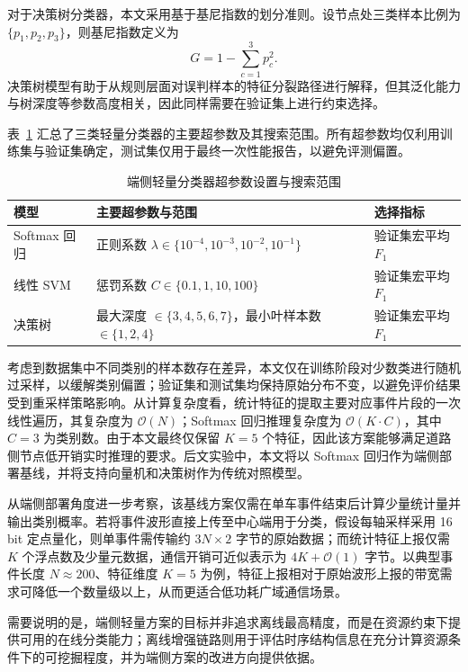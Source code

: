 \documentclass{xdupgthesis}
\begin{document}
对于决策树分类器，本文采用基于基尼指数的划分准则。设节点处三类样本比例为 $\{p_1,p_2,p_3\}$，则基尼指数定义为
\begin{equation}
    G=1-\sum_{c=1}^{3}p_c^2.
\end{equation}
决策树模型有助于从规则层面对误判样本的特征分裂路径进行解释，但其泛化能力与树深度等参数高度相关，因此同样需要在验证集上进行约束选择。

表~\ref{tab:ch3_edge_hyper} 汇总了三类轻量分类器的主要超参数及其搜索范围。所有超参数均仅利用训练集与验证集确定，测试集仅用于最终一次性能报告，以避免评测偏置。

\begin{table}[!htbp]
\centering
\small
\caption{端侧轻量分类器超参数设置与搜索范围}
\label{tab:ch3_edge_hyper}
\setlength{\tabcolsep}{6pt}
\renewcommand{\arraystretch}{1.15}
\begin{tabular}{p{3.1cm} p{7.2cm} p{2.8cm}}
\hline
模型 & 主要超参数与范围 & 选择指标 \\
\hline
Softmax 回归 & 正则系数 $\lambda\in\{10^{-4},10^{-3},10^{-2},10^{-1}\}$ & 验证集宏平均 $F_1$ \\
线性 SVM & 惩罚系数 $C\in\{0.1,1,10,100\}$ & 验证集宏平均 $F_1$ \\
决策树 & 最大深度 $\in\{3,4,5,6,7\}$，最小叶样本数 $\in\{1,2,4\}$ & 验证集宏平均 $F_1$ \\
\hline
\end{tabular}
\end{table}

考虑到数据集中不同类别的样本数存在差异，本文仅在训练阶段对少数类进行随机过采样，以缓解类别偏置；验证集和测试集均保持原始分布不变，以避免评价结果受到重采样策略影响。从计算复杂度看，统计特征的提取主要对应事件片段的一次线性遍历，其复杂度为 $\mathcal{O}(N)$；Softmax 回归推理复杂度为 $\mathcal{O}(K\cdot C)$，其中 $C=3$ 为类别数。由于本文最终仅保留 $K=5$ 个特征，因此该方案能够满足道路侧节点低开销实时推理的要求。后文实验中，本文将以 Softmax 回归作为端侧部署基线，并将支持向量机和决策树作为传统对照模型。


从端侧部署角度进一步考察，该基线方案仅需在单车事件结束后计算少量统计量并输出类别概率。若将事件波形直接上传至中心端用于分类，假设每轴采样采用 16 bit 定点量化，则单事件需传输约 $3N\times 2$ 字节的原始数据；而统计特征上报仅需 $K$ 个浮点数及少量元数据，通信开销可近似表示为 $4K+\mathcal{O}(1)$ 字节。以典型事件长度 $N\approx 200$、特征维度 $K=5$ 为例，特征上报相对于原始波形上报的带宽需求可降低一个数量级以上，从而更适合低功耗广域通信场景。

需要说明的是，端侧轻量方案的目标并非追求离线最高精度，而是在资源约束下提供可用的在线分类能力；离线增强链路则用于评估时序结构信息在充分计算资源条件下的可挖掘程度，并为端侧方案的改进方向提供依据。
\end{document}
